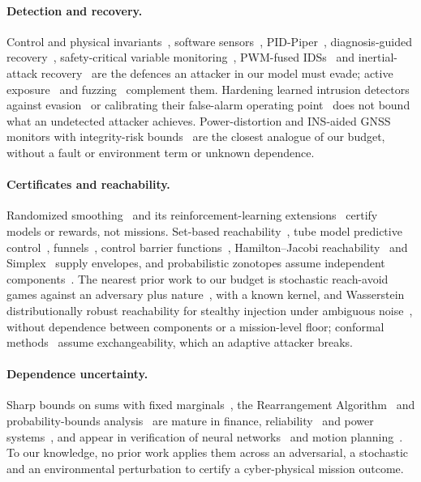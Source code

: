 \paragraph{Detection and recovery.}
Control and physical invariants~\cite{choi2018,quinonez2020savior}, software
sensors~\cite{choi2020raid}, PID-Piper~\cite{dash2021pidpiper}, diagnosis-guided
recovery~\cite{dash2024delorean}, safety-critical variable
monitoring~\cite{park2023scvmon}, PWM-fused IDSs~\cite{asif2024confide} and
inertial-attack recovery~\cite{meng2025mars} are the defences an attacker in our
model must evade; active exposure~\cite{tian2026} and
fuzzing~\cite{kim2019rvfuzzer,kim2021pgfuzz} complement them. Hardening learned intrusion detectors against
evasion~\cite{evasionids2024} or calibrating their false-alarm operating
point~\cite{hgpids2026} does not bound what an undetected attacker achieves. Power-distortion
and INS-aided GNSS monitors with integrity-risk bounds~\cite{wesson2018pdm,tanil2018}
are the closest analogue of our budget, without a fault or environment term or
unknown dependence.

\paragraph{Certificates and reachability.}
Randomized smoothing~\cite{cohen2019smoothing,salman2019,lecuyer2019} and its
reinforcement-learning extensions~\cite{kumar2022policy,wu2022crop,mu2024receps}
certify models or rewards, not missions. Set-based
reachability~\cite{althoff2021,althoff2010,scott2016}, tube model predictive
control~\cite{mayne2005}, funnels~\cite{tedrake2010,majumdar2017}, control
barrier functions~\cite{ames2019}, Hamilton--Jacobi
reachability~\cite{bansal2017} and Simplex~\cite{sha2001} supply envelopes, and
probabilistic zonotopes assume independent components~\cite{althoff2010,modares2026pz}.
The nearest prior work to our budget is stochastic reach-avoid games against an
adversary plus nature~\cite{ding2013games}, with a known kernel, and Wasserstein
distributionally robust reachability for stealthy injection under ambiguous
noise~\cite{feng2025wdr}, without dependence between components or a
mission-level floor; conformal methods~\cite{lindemann2023ral,lindemann2023iccps}
assume exchangeability, which an adaptive attacker breaks.

\paragraph{Dependence uncertainty.}
Sharp bounds on sums with fixed marginals~\cite{makarov1981,ruschendorf1982,frank1987},
the Rearrangement Algorithm~\cite{puccetti2012,puccetti2013,embrechts2013var,hofert2020,bernard2026}
and probability-bounds analysis~\cite{williamson1990,ferson2003,ferson2004,bouissou2012}
are mature in finance, reliability~\cite{song2020dba} and power
systems~\cite{papaefthymiou2009,arrigo2023,amiri2021}, and appear in verification
of neural networks~\cite{goubault2024,pifarre2026,chwialkowski2026} and motion
planning~\cite{ilyes2023stori}. To our knowledge, no prior work applies them
across an adversarial, a stochastic and an environmental perturbation to certify
a cyber-physical mission outcome.
